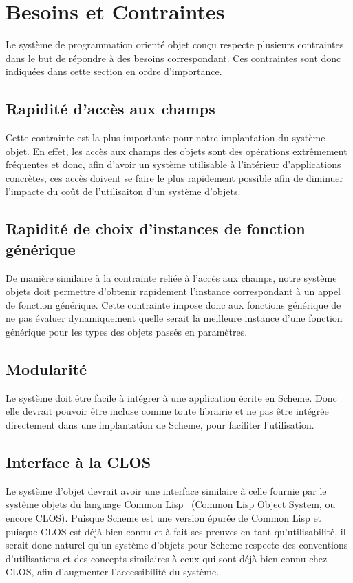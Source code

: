 \documentclass[letterpaper,12pt]{book}
\begin{document}
\clearpage



  \section{Besoins et Contraintes}
    Le système de programmation orienté objet conçu respecte plusieurs
    contraintes dans le but de répondre à des besoins
    correspondant. Ces contraintes sont donc indiquées dans cette
    section en ordre d'importance.

    \subsection{Rapidité d'accès aux champs}
      Cette contrainte est la plus importante pour notre implantation
      du système objet. En effet, les accès aux champs des objets sont
      des opérations extrêmement fréquentes et donc, afin d'avoir un
      système utilisable à l'intérieur d'applications concrètes, ces
      accès doivent se faire le plus rapidement possible afin de
      diminuer l'impacte du coût de l'utilisaiton d'un système
      d'objets.

    \subsection{Rapidité de choix d'instances de fonction générique}
      De manière similaire à la contrainte reliée à l'accès aux
      champs, notre système objets doit permettre d'obtenir rapidement
      l'instance correspondant à un appel de fonction générique. Cette
      contrainte impose donc aux fonctions générique de ne pas évaluer
      dynamiquement quelle serait la meilleure instance d'une fonction
      générique pour les types des objets passés en paramètres.

    \subsection{Modularité}
      Le système doit être facile à intégrer à une application écrite
      en Scheme. Donc elle devrait pouvoir être incluse comme toute
      librairie et ne pas être intégrée directement dans une
      implantation de Scheme, pour faciliter l'utilisation.

    \subsection{Interface à la CLOS}
      Le système d'objet devrait avoir une interface similaire à celle
      fournie par le système objets du language Common
      Lisp~\cite{COMMONLISP} (Common Lisp Object System, ou encore
      CLOS). Puisque Scheme est une version épurée de Common Lisp et
      puisque CLOS est déjà bien connu et à fait ses preuves en tant
      qu'utilisabilité, il serait donc naturel qu'un système d'objets
      pour Scheme respecte des conventions d'utilisations et des
      concepts similaires à ceux qui sont déjà bien connu chez CLOS,
      afin d'augmenter l'accessibilité du système.
    
\end{document}
